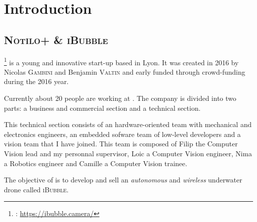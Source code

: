 
\chapter{Introduction} %

\label{Introduction} %


\newcommand{\keyword}[1]{\textbf{#1}}
\newcommand{\tabhead}[1]{\textbf{#1}}
\newcommand{\code}[1]{\texttt{#1}}
\newcommand{\file}[1]{\texttt{\bfseries#1}}
\newcommand{\option}[1]{\texttt{\itshape#1}}
\newcommand{\iBubble}{\textcolor{mdtRed}{\textsc{iBubble}}}
\newcommand{\rasp}{\textcolor{mdtRed}{\textsc{Raspberry Pi}}}
\newcommand{\vc}{\textcolor{mdtRed}{\textsc{VideoCore IV 3D}}}
\newcommand{\cpu}{\textcolor{mdtRed}{\textsc{ARM CPU}}}
\newcommand{\bcm}{\textcolor{mdtRed}{\textsc{BCM2837}}}
\newcommand{\qpu}{\textcolor{mdtRed}{\textsc{QPU}}}


\section{\textsc{Notilo+} \& \textsc{iBubble}}

\footnote{\groupname{}: \url{https://ibubble.camera/}}\groupname{} is a young and innovative start-up based in Lyon. It was created in 2016 by Nicolas \textsc{Gambini} and Benjamin \textsc{Valtin} and early funded through crowd-funding during the 2016 year.

Currently about 20 people are working at \groupname{}. The company is divided into two parts: a business and commercial section and a technical section.

This technical section consists of an hardware-oriented team with mechanical and electronics engineers, an embedded sofware team of low-level developers and a vision team that I have joined. This team is composed of Filip the Computer Vision lead and my personnal supervisor, Loic a Computer Vision engineer, Nima a Robotics engineer and Camille a Computer Vision trainee.

The objective of \groupname{} is to develop and sell an \emph{autonomous} and \emph{wireless} underwater drone called \iBubble.

